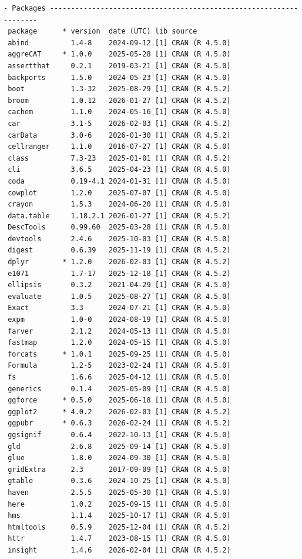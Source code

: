\documentclass[article]{jss}
\begin{document}
\begin{tcolorbox}[enhanced jigsaw, arc=.35mm, bottomrule=.15mm, breakable, colback=white, colframe=quarto-callout-color-frame, left=2mm, leftrule=.75mm, opacityback=0, rightrule=.15mm, toprule=.15mm]
\begin{verbatim}
- Packages -------------------------------------------------------------------
 package      * version  date (UTC) lib source
 abind          1.4-8    2024-09-12 [1] CRAN (R 4.5.0)
 aggreCAT     * 1.0.0    2025-05-28 [1] CRAN (R 4.5.0)
 assertthat     0.2.1    2019-03-21 [1] CRAN (R 4.5.0)
 backports      1.5.0    2024-05-23 [1] CRAN (R 4.5.0)
 boot           1.3-32   2025-08-29 [1] CRAN (R 4.5.2)
 broom          1.0.12   2026-01-27 [1] CRAN (R 4.5.2)
 cachem         1.1.0    2024-05-16 [1] CRAN (R 4.5.0)
 car            3.1-5    2026-02-03 [1] CRAN (R 4.5.2)
 carData        3.0-6    2026-01-30 [1] CRAN (R 4.5.2)
 cellranger     1.1.0    2016-07-27 [1] CRAN (R 4.5.0)
 class          7.3-23   2025-01-01 [1] CRAN (R 4.5.2)
 cli            3.6.5    2025-04-23 [1] CRAN (R 4.5.0)
 coda           0.19-4.1 2024-01-31 [1] CRAN (R 4.5.0)
 cowplot        1.2.0    2025-07-07 [1] CRAN (R 4.5.0)
 crayon         1.5.3    2024-06-20 [1] CRAN (R 4.5.0)
 data.table     1.18.2.1 2026-01-27 [1] CRAN (R 4.5.2)
 DescTools      0.99.60  2025-03-28 [1] CRAN (R 4.5.0)
 devtools       2.4.6    2025-10-03 [1] CRAN (R 4.5.0)
 digest         0.6.39   2025-11-19 [1] CRAN (R 4.5.2)
 dplyr        * 1.2.0    2026-02-03 [1] CRAN (R 4.5.2)
 e1071          1.7-17   2025-12-18 [1] CRAN (R 4.5.2)
 ellipsis       0.3.2    2021-04-29 [1] CRAN (R 4.5.0)
 evaluate       1.0.5    2025-08-27 [1] CRAN (R 4.5.0)
 Exact          3.3      2024-07-21 [1] CRAN (R 4.5.0)
 expm           1.0-0    2024-08-19 [1] CRAN (R 4.5.0)
 farver         2.1.2    2024-05-13 [1] CRAN (R 4.5.0)
 fastmap        1.2.0    2024-05-15 [1] CRAN (R 4.5.0)
 forcats      * 1.0.1    2025-09-25 [1] CRAN (R 4.5.0)
 Formula        1.2-5    2023-02-24 [1] CRAN (R 4.5.0)
 fs             1.6.6    2025-04-12 [1] CRAN (R 4.5.0)
 generics       0.1.4    2025-05-09 [1] CRAN (R 4.5.0)
 ggforce      * 0.5.0    2025-06-18 [1] CRAN (R 4.5.0)
 ggplot2      * 4.0.2    2026-02-03 [1] CRAN (R 4.5.2)
 ggpubr       * 0.6.3    2026-02-24 [1] CRAN (R 4.5.2)
 ggsignif       0.6.4    2022-10-13 [1] CRAN (R 4.5.0)
 gld            2.6.8    2025-09-14 [1] CRAN (R 4.5.0)
 glue           1.8.0    2024-09-30 [1] CRAN (R 4.5.0)
 gridExtra      2.3      2017-09-09 [1] CRAN (R 4.5.0)
 gtable         0.3.6    2024-10-25 [1] CRAN (R 4.5.0)
 haven          2.5.5    2025-05-30 [1] CRAN (R 4.5.0)
 here           1.0.2    2025-09-15 [1] CRAN (R 4.5.0)
 hms            1.1.4    2025-10-17 [1] CRAN (R 4.5.0)
 htmltools      0.5.9    2025-12-04 [1] CRAN (R 4.5.2)
 httr           1.4.7    2023-08-15 [1] CRAN (R 4.5.0)
 insight        1.4.6    2026-02-04 [1] CRAN (R 4.5.2)

\end{verbatim}
\end{tcolorbox}
\end{document}

